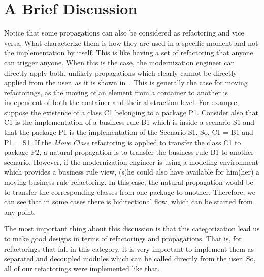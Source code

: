 
\section{A Brief Discussion}\label{sec:a_brief_discussion}

Notice that some propagations can also be considered as refactoring and vice versa. What characterize them is how they are used in a specific moment and not the implementation by itself. This is like having a set of refactoring that anyone can trigger anyone. When this is the case, the modernization engineer can directly apply both, unlikely propagations which clearly cannot be directly applied from the user, as it is shown in~\cite{ICSOFT2014_Winetzhammer}. This is generally the case for moving refactorings, as the moving of an element from a container to another is independent of both the container and their abstraction level. For example, suppose the existence of a class C1 belonging to a package P1. Consider also that C1 is the implementation of a business rule B1 which is inside a scenario S1 and that the package P1 is the implementation of the Scenario S1. So, C1 = B1 and P1 = S1. If the \textit{Move Class} refactoring is applied to transfer the class C1 to package P2, a natural propagation is to transfer the business rule B1 to another scenario. However, if the modernization engineer is using a modeling environment which provides a business rule view, (s)he could also have available for him(her) a moving business rule refactoring. In this case, the natural propagation would be to transfer the corresponding classes from one package to another. Therefore, we can see that in some cases there is bidirectional flow, which can be started from any point. 

The most important thing about this discussion is that this categorization lead us to make good designs in terms of refactorings and propagations. That is, for refactorings that fall in this category, it is very important to implement them as separated and decoupled modules which can be called directly from the user. So, all of our refactorings were implemented like that. 
